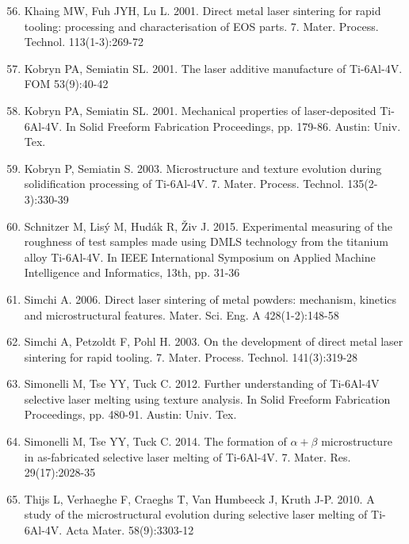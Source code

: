 \documentclass[10pt]{article}
\begin{document}
\begin{enumerate}
  \setcounter{enumi}{55}
  \item Khaing MW, Fuh JYH, Lu L. 2001. Direct metal laser sintering for rapid tooling: processing and characterisation of EOS parts. 7. Mater. Process. Technol. 113(1-3):269-72

  \item Kobryn PA, Semiatin SL. 2001. The laser additive manufacture of Ti-6Al-4V. FOM 53(9):40-42

  \item Kobryn PA, Semiatin SL. 2001. Mechanical properties of laser-deposited Ti-6Al-4V. In Solid Freeform Fabrication Proceedings, pp. 179-86. Austin: Univ. Tex.

  \item Kobryn P, Semiatin S. 2003. Microstructure and texture evolution during solidification processing of Ti-6Al-4V. 7. Mater. Process. Technol. 135(2-3):330-39

  \item Schnitzer M, Lisý M, Hudák R, Živ J. 2015. Experimental measuring of the roughness of test samples made using DMLS technology from the titanium alloy Ti-6Al-4V. In IEEE International Symposium on Applied Machine Intelligence and Informatics, 13th, pp. 31-36

  \item Simchi A. 2006. Direct laser sintering of metal powders: mechanism, kinetics and microstructural features. Mater. Sci. Eng. A 428(1-2):148-58

  \item Simchi A, Petzoldt F, Pohl H. 2003. On the development of direct metal laser sintering for rapid tooling. 7. Mater. Process. Technol. 141(3):319-28

  \item Simonelli M, Tse YY, Tuck C. 2012. Further understanding of Ti-6Al-4V selective laser melting using texture analysis. In Solid Freeform Fabrication Proceedings, pp. 480-91. Austin: Univ. Tex.

  \item Simonelli M, Tse YY, Tuck C. 2014. The formation of $\alpha+\beta$ microstructure in as-fabricated selective laser melting of Ti-6Al-4V. 7. Mater. Res. 29(17):2028-35

  \item Thijs L, Verhaeghe F, Craeghs T, Van Humbeeck J, Kruth J-P. 2010. A study of the microstructural evolution during selective laser melting of Ti-6Al-4V. Acta Mater. 58(9):3303-12


\end{enumerate}
\end{document}
